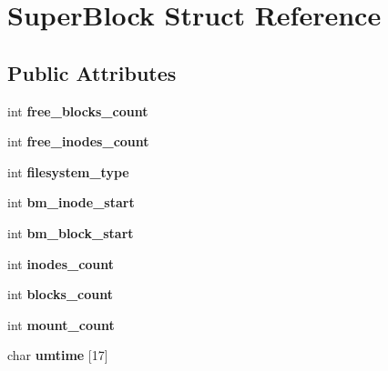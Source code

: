 \hypertarget{structSuperBlock}{}\section{Super\+Block Struct Reference}
\label{structSuperBlock}
\subsection*{Public Attributes}
\begin{DoxyCompactItemize}
\item 
\mbox{\label{structSuperBlock_a2f5bd4059a7ced7681428101f72ca5c8}} 
int {\bfseries free\+\_\+blocks\+\_\+count}
\item 
\mbox{\label{structSuperBlock_a8c37001b0f5d58640342884c28308f98}} 
int {\bfseries free\+\_\+inodes\+\_\+count}
\item 
\mbox{\label{structSuperBlock_a4864d67d634fd6afdd453a58060ee7d9}} 
int {\bfseries filesystem\+\_\+type}
\item 
\mbox{\label{structSuperBlock_a0cdc6adec4a98dd8d16693c69fb09312}} 
int {\bfseries bm\+\_\+inode\+\_\+start}
\item 
\mbox{\label{structSuperBlock_aca98d61ccd0c0c57388f22fccd2b3cb1}} 
int {\bfseries bm\+\_\+block\+\_\+start}
\item 
\mbox{\label{structSuperBlock_a8470f241141fe506a108e182b0ca0aef}} 
int {\bfseries inodes\+\_\+count}
\item 
\mbox{\label{structSuperBlock_a09a1031165c92c3765f5772278c9f221}} 
int {\bfseries blocks\+\_\+count}
\item 
\mbox{\label{structSuperBlock_aa90e7021b632ef77b1c2d63abe5d612b}} 
int {\bfseries mount\+\_\+count}
\item 
\mbox{\label{structSuperBlock_a5b08b9d48ab656d0ba6ca31b006e08ed}} 
char {\bfseries umtime} \mbox{[}17\mbox{]}
\item 
\mbox{\label{structSuperBlock_aead822273dd1ec9a18bb517c66af32d3}} 

\end{DoxyCompactItemize}
